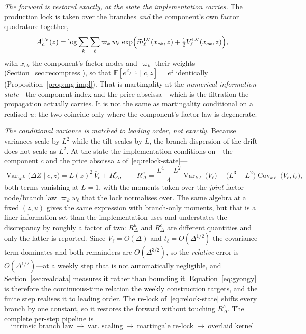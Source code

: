 \documentclass[11pt]{article}
\newcommand{\E}{\mathbb{E}}
\newcommand{\Var}{\operatorname{Var}}
\newcommand{\Cov}{\operatorname{Cov}}
\newcommand{\cK}{\mathcal{K}}
\providecommand{\1}{\mathbf 1}
\begin{document}
\emph{The forward is restored exactly, at the state the implementation carries.} The production lock
is taken over the branches \emph{and} the component's own factor quadrature together,
\begin{equation}\label{eq:relock-state}
  A^{\mathrm{LV}}_c(z)=\log\sum_{k}\sum_{\ell}\varpi_k\,w_\ell\,
    \exp\Bigl(\widetilde m^{\mathrm{LV}}_{\ell}(x_{ck},z)+\tfrac12V^{\mathrm{LV}}_{\ell}(x_{ck},z)\Bigr),
\end{equation}
with $x_{ck}$ the component's factor nodes and $\varpi_k$ their weights
(Section~\ref{sec:recompress}), so that $\E[e^{Z_{j+1}}\mid c,z]=e^{z}$ identically
(Proposition~\ref{prop:mg-impl}). That is martingality at the \emph{numerical information
state}---the component index and the price
abscissa---which is the filtration the propagation actually carries. It is not the same as
martingality conditional on a realised $u$: the two coincide only where the component's factor law
is degenerate.

\emph{The conditional variance is matched to leading order, not exactly.} Because variances scale by
$L^2$ while the tilt scales by $L$, the branch dispersion of the drift does not scale as $L^2$. At
the state the implementation conditions on---the component $c$ and the price abscissa $z$
of~\eqref{eq:relock-state}---
\begin{equation}\label{eq:levremainder-prod}
  \Var_{\cK^{L}}\bigl(\Delta Z\mid c,z\bigr)=L(z)^2\,\overline V_{c}+R^{c}_\Delta,
  \qquad
  R^{c}_\Delta=\frac{L^4-L^2}{4}\Var_{k\ell}\bigl(V_\ell\bigr)
    -\bigl(L^3-L^2\bigr)\Cov_{k\ell}\bigl(V_\ell,t_\ell\bigr),
\end{equation}
both terms vanishing at $L=1$, with the moments taken over the \emph{joint} factor-node/branch law
$\varpi_kw_\ell$ that the lock normalises over. The same algebra at a fixed $(z,u)$ gives the same
expression with branch-only moments, but that is a finer information set than the implementation
uses and understates the discrepancy by roughly a factor of two: $R^{u}_\Delta$ and $R^{c}_\Delta$
are different quantities and only the latter is reported. Since $V_\ell=O(\Delta)$ and
$t_\ell=O(\Delta^{1/2})$ the
covariance term dominates and both remainders are $O(\Delta^{3/2})$, so the \emph{relative} error is $O(\Delta^{1/2})$---at
a weekly step that is not automatically negligible, and Section~\ref{sec:realdata} measures it rather
than bounding it. Equation~\eqref{eq:gyongy} is therefore the continuous-time relation the weekly
construction targets, and the finite step realises it to leading order. The re-lock
of~\eqref{eq:relock-state} shifts every branch by one constant, so it restores the forward without
touching $R^{c}_\Delta$. The complete per-step pipeline is
\begin{equation*}
\boxed{\ \text{intrinsic branch law}\ \longrightarrow\ \text{var.\ scaling}\
\longrightarrow\ \text{martingale re-lock}\ \longrightarrow\ \text{overlaid kernel}\ }
\end{equation*}
\end{document}
